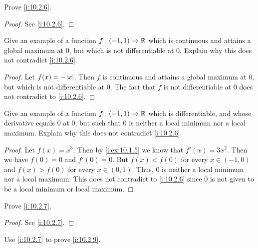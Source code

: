 \exercisesection

\begin{ex}\label{i:ex:10.2.1}
  Prove \cref{i:10.2.6}.
\end{ex}

\begin{proof}
  See \cref{i:10.2.6}.
\end{proof}

\begin{ex}\label{i:ex:10.2.2}
  Give an example of a function \(f : (-1, 1) \to \mathbb{R}\) which is continuous and attains a global maximum at \(0\), but which is not differentiable at \(0\).
  Explain why this does not contradict \cref{i:10.2.6}.
\end{ex}

\begin{proof}
  Let \(f(x) = -\abs{x}\).
  Then \(f\) is continuous and attains a global maximum at \(0\), but which is not differentiable at \(0\).
  The fact that \(f\) is not differentiable at \(0\) does not contradict to \cref{i:10.2.6}.
\end{proof}

\begin{ex}\label{i:ex:10.2.3}
  Give an example of a function \(f : (-1, 1) \to \mathbb{R}\) which is differentiable, and whose derivative equals \(0\) at \(0\), but such that \(0\) is neither a local minimum nor a local maximum.
  Explain why this does not contradict \cref{i:10.2.6}.
\end{ex}

\begin{proof}
  Let \(f(x) = x^3\).
  Then by \cref{i:ex:10.1.5} we know that \(f'(x) = 3x^2\).
  Then we have \(f(0) = 0\) and \(f'(0) = 0\).
  But \(f(x) < f(0)\) for every \(x \in (-1, 0)\) and \(f(x) > f(0)\) for every \(x \in (0, 1)\).
  Thus, \(0\) is neither a local minimum nor a local maximum.
  This does not contradict to \cref{i:10.2.6} since \(0\) is not given to be a local minimum or local maximum.
\end{proof}

\begin{ex}\label{i:ex:10.2.4}
  Prove \cref{i:10.2.7}.
\end{ex}

\begin{proof}
  See \cref{i:10.2.7}.
\end{proof}

\begin{ex}\label{i:ex:10.2.5}
  Use \cref{i:10.2.7} to prove \cref{i:10.2.9}.
\end{ex}


